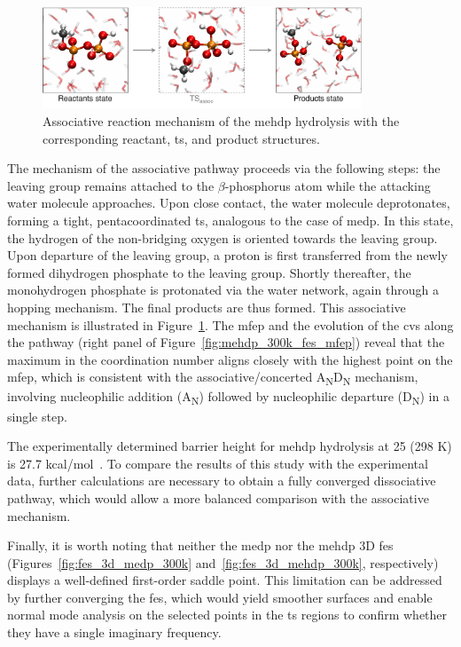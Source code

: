 \begin{figure}[b!]
\centering
\includegraphics[width=0.85\textwidth]{Figures/4_Results/results_mehdp_mechanism.pdf}
\caption{Associative reaction mechanism of the \ac{mehdp} hydrolysis with the corresponding reactant, \ac{ts}, and product structures.}
\label{fig:mehdp_reaction_mechanism}
\end{figure}

The mechanism of the associative pathway proceeds via the following steps: the leaving group remains attached to the $\beta$-phosphorus atom while the attacking water molecule approaches. Upon close contact, the water molecule deprotonates, forming a tight, pentacoordinated \ac{ts}, analogous to the case of \ac{medp}. In this state, the hydrogen of the non-bridging oxygen is oriented towards the leaving group. Upon departure of the leaving group, a proton is first transferred from the newly formed dihydrogen phosphate to the leaving group. Shortly thereafter, the monohydrogen phosphate is protonated via the water network, again through a hopping mechanism. The final products are thus formed. This associative mechanism is illustrated in Figure~\ref{fig:mehdp_reaction_mechanism}. The \ac{mfep} and the evolution of the \acp{cv} along the pathway (right panel of Figure~\ref{fig:mehdp_300k_fes_mfep}) reveal that the maximum in the coordination number aligns closely with the highest point on the \ac{mfep}, which is consistent with the associative/concerted A\textsubscript{N}D\textsubscript{N} mechanism, involving nucleophilic addition (A\textsubscript{N}) followed by nucleophilic departure (D\textsubscript{N}) in a single step.

The experimentally determined barrier height for \ac{mehdp} hydrolysis at 25 (298 K) is 27.7 kcal/mol~\citep{wolfendenDegreesDifficultyWaterConsuming2006}. To compare the results of this study with the experimental data, further calculations are necessary to obtain a fully converged dissociative pathway, which would allow a more balanced comparison with the associative mechanism.

Finally, it is worth noting that neither the \ac{medp} nor the \ac{mehdp} 3D \ac{fes} (Figures~\ref{fig:fes_3d_medp_300k} and~\ref{fig:fes_3d_mehdp_300k}, respectively) displays a well-defined first-order saddle point. This limitation can be addressed by further converging the \ac{fes}, which would yield smoother surfaces and enable normal mode analysis on the selected points in the \ac{ts} regions to confirm whether they have a single imaginary frequency.



